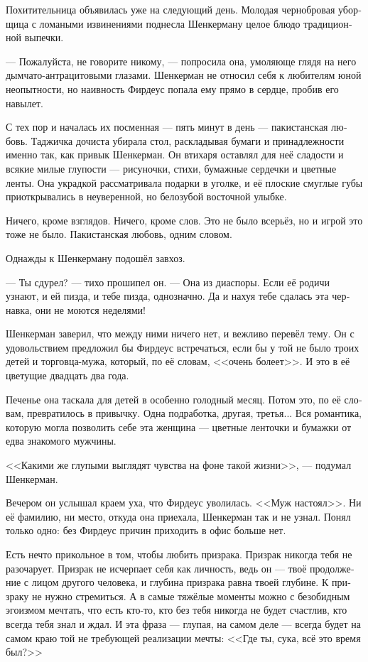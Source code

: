 \documentclass[a5paper,12pt,fleqn]{extbook}\usepackage{cooltooltips}\usepackage{polyglossia}\setdefaultlanguage[babelshorthands=true]{russian}\setotherlanguage{english}\defaultfontfeatures{Ligatures=TeX,Mapping=tex-text} \usepackage{xcolor}\definecolor{lightgray}{HTML}{bbbbbb}\color{lightgray}\newcommand{\ml}[3]{\textenglish{\textcolor{black}{#3}}}
\newcommand{\asterism}{\vspace{1em}{\centering\Large\bfseries$\ast~\ast~\ast$\par}\vspace{1em}}
\begin{document}
Похитительница объявилась уже на следующий день.
Молодая чернобровая уборщица с ломаными извинениями поднесла Шенкерману целое блюдо традиционной выпечки.

--- Пожалуйста, не говорите никому, --- попросила она, умоляюще глядя на него дымчато-антрацитовыми глазами.
Шенкерман не относил себя к любителям юной неопытности, но наивность Фирдеус попала ему прямо в сердце, пробив его навылет.

С тех пор и началась их посменная --- пять минут в день --- пакистанская любовь.
Таджичка дочиста убирала стол, раскладывая бумаги и принадлежности именно так, как привык Шенкерман.
Он втихаря оставлял для неё сладости и всякие милые глупости --- рисуночки, стихи, бумажные сердечки и цветные ленты.
Она украдкой рассматривала подарки в уголке, и её плоские смуглые губы приоткрывались в неуверенной, но белозубой восточной улыбке.

Ничего, кроме взглядов.
Ничего, кроме слов.
Это не было всерьёз, но и игрой это тоже не было.
Пакистанская любовь, одним словом.

Однажды к Шенкерману подошёл завхоз.

--- Ты сдурел? --- тихо прошипел он.
--- Она из диаспоры.
Если её родичи узнают, и ей пизда, и тебе пизда, однозначно.
Да и нахуя тебе сдалась эта чернавка, они не моются неделями!

Шенкерман заверил, что между ними ничего нет, и вежливо перевёл тему.
Он с удовольствием предложил бы Фирдеус встречаться, если бы у той не было троих детей и торговца-мужа, который, по её словам, <<очень болеет>>.
И это в её цветущие двадцать два года.

Печенье она таскала для детей в особенно голодный месяц.
Потом это, по её словам, превратилось в привычку.
Одна подработка, другая, третья...
Вся романтика, которую могла позволить себе эта женщина --- цветные ленточки и бумажки от едва знакомого мужчины.

<<Какими же глупыми выглядят чувства на фоне такой жизни>>, --- подумал Шенкерман.

Вечером он услышал краем уха, что Фирдеус уволилась.
<<Муж настоял>>.
Ни её фамилию, ни место, откуда она приехала, Шенкерман так и не узнал.
Понял только одно: без Фирдеус причин приходить в офис больше нет.

\asterism

Есть нечто прикольное в том, чтобы любить призрака.
Призрак никогда тебя не разочарует.
Призрак не исчерпает себя как личность, ведь он --- твоё продолжение с лицом другого человека, и глубина призрака равна твоей глубине.
К призраку не нужно стремиться.
А в самые тяжёлые моменты можно с безобидным эгоизмом мечтать, что есть кто-то, кто без тебя никогда не будет счастлив, кто всегда тебя знал и ждал.
И эта фраза --- глупая, на самом деле --- всегда будет на самом краю той не требующей реализации мечты:
<<Где ты, сука, всё это время был?>>
\end{document}
